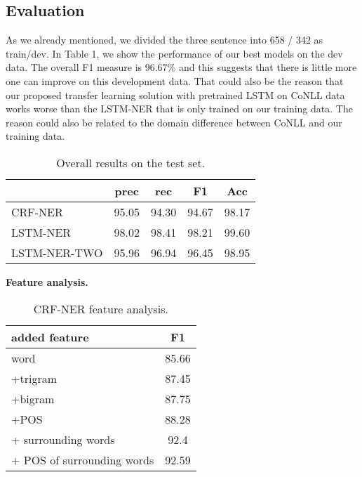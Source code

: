 \documentclass[11pt]{article}
\begin{document}
\subsection{Evaluation}
As we already mentioned, we divided
the three sentence into 658 / 342 as train/dev.
In Table 1, we show the performance of our best models on the dev data.
The overall F1 measure is 96.67\% and this suggests that
there is  little more one can improve on this development data.
That could also be the reason that our proposed transfer learning 
solution with pretrained LSTM on CoNLL data 
works worse than the LSTM-NER that is only trained on our 
training data.
The reason could also be related to the domain difference between
CoNLL and our training data.


\begin{table}[ht]
\begin{center}
\begin{tabular}{l|c|c|c|c}
\hline 
& prec & rec & F1 & Acc\\ 
\hline 
CRF-NER  & 95.05 & 94.30 & 94.67 & 98.17\\ 
\hline 
LSTM-NER          & 98.02 & 98.41 & 98.21 & 99.60\\ 
\hline
LSTM-NER-TWO & 95.96 & 96.94 & 96.45 & 98.95 \\

 
\end{tabular} 
\caption{Overall results on the test set. }
\end{center}
\label{perf}
\end{table}

\textbf{Feature analysis.}

\begin{table}
\begin{center}
\begin{tabular}{l|c}
\hline 
added feature & F1 \\ 
\hline 
word     & 85.66 \\
+trigram & 87.45 \\
+bigram  & 87.75 \\
+POS  & 88.28 \\
+ surrounding words & 92.4 \\
+ POS of surrounding words & 92.59
\end{tabular} 
\caption{CRF-NER feature analysis.}
\end{center}
\label{perf}
\end{table}
\end{document}
